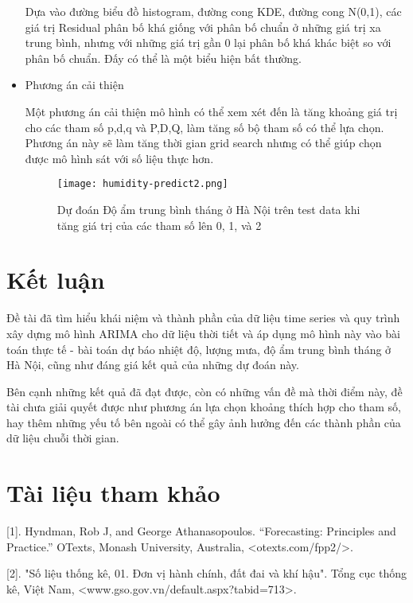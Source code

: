 \documentclass[12pt]{article}
\begin{document}
\begin{itemize}
            Dựa vào đường biểu đồ histogram, đường cong KDE, đường cong N(0,1), các giá trị Residual phân bố khá giống với phân bố chuẩn ở những giá trị xa trung bình, nhưng với những giá trị gần 0 lại phân bố khá khác biệt so với phân bố chuẩn. Đấy có thể là một biểu hiện bất thường.
            
            \item Phương án cải thiện
            
            Một phương án cải thiện mô hình có thể xem xét đến là tăng khoảng giá trị cho các tham số p,d,q và P,D,Q, làm tăng số bộ tham số có thể lựa chọn. Phương án này sẽ làm tăng thời gian grid search nhưng có thể giúp chọn được mô hình sát với số liệu thực hơn.
            
            \begin{figure}[H]
                \centering
                \texttt{[image: humidity-predict2.png]}
                \caption{Dự đoán Độ ẩm trung bình tháng ở Hà Nội trên test data khi tăng giá trị của các tham số lên 0, 1, và 2}
            \end{figure}
            
    \end{itemize}
    
\section{Kết luận}
Đề tài đã tìm hiểu khái niệm và thành phần của dữ liệu time series và quy trình xây dựng mô hình ARIMA cho dữ liệu thời tiết và áp dụng mô hình này vào bài toán thực tế - bài toán dự báo nhiệt độ, lượng mưa, độ ẩm trung bình tháng ở Hà Nội, cũng như đáng giá kết quả của những dự đoán này.

Bên cạnh những kết quả đã đạt được, còn có những vấn đề mà thời điểm này, đề tài  chưa giải quyết được như phương án lựa chọn khoảng thích hợp cho tham số, hay thêm những yếu tố bên ngoài có thể gây ảnh hưởng đến các thành phần của dữ liệu chuỗi thời gian.

\section{Tài liệu tham khảo}

[1]. Hyndman, Rob J, and George Athanasopoulos. “Forecasting: Principles and Practice.” OTexts, Monash University, Australia, <otexts.com/fpp2/>.

[2]. "Số liệu thống kê, 01. Đơn vị hành chính, đất đai và khí hậu". Tổng cục thống kê, Việt Nam, <www.gso.gov.vn/default.aspx?tabid=713>.
\end{document}
